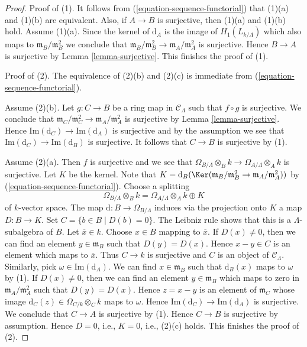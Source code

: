 \begin{proof}
Proof of (1). It follows from (\ref{equation-sequence-functorial})
that (1)(a) and (1)(b) are equivalent. Also, if
$A \to B$ is surjective, then (1)(a) and (1)(b) hold. Assume (1)(a).
Since the kernel of $\text{d}_A$ is the image of
$H_1(L_{k/\Lambda})$ which also maps to
$\mathfrak m_B/\mathfrak m_B^2$ we conclude that
$\mathfrak m_B/\mathfrak m_B^2 \to \mathfrak m_A/\mathfrak m_A^2$
is surjective. Hence $B \to A$ is surjective by
Lemma \ref{lemma-surjective}. This finishes the proof of (1).

\medskip\noindent
Proof of (2). The equivalence of (2)(b) and (2)(c) is immediate from
(\ref{equation-sequence-functorial}).

\medskip\noindent
Assume (2)(b). Let $g : C \to B$ be a ring map in $\mathcal{C}_\Lambda$
such that $f \circ g$ is surjective. We conclude that
$\mathfrak m_C/\mathfrak m_C^2 \to \mathfrak m_A/\mathfrak m_A^2$
is surjective by
Lemma \ref{lemma-surjective}.
Hence
$\text{Im}(\text{d}_C) \to \text{Im}(\text{d}_A)$ is surjective
and by the assumption we see that
$\text{Im}(\text{d}_C) \to \text{Im}(\text{d}_B)$ is surjective.
It follows that $C \to B$ is surjective by (1).

\medskip\noindent
Assume (2)(a). Then $f$ is surjective and we see that
$\Omega_{B/\Lambda} \otimes_B k \to \Omega_{A/\Lambda} \otimes_A k$
is surjective. Let $K$ be the kernel. Note that
$K = \text{d}_B(\Ker(\mathfrak m_B/\mathfrak m_B^2 \to
\mathfrak m_A/\mathfrak m_A^2))$ by (\ref{equation-sequence-functorial}).
Choose a splitting
$$
\Omega_{B/\Lambda} \otimes_B k =
\Omega_{A/\Lambda} \otimes_A k \oplus K
$$
of $k$-vector space. The map $\text{d} : B \to \Omega_{B/\Lambda}$
induces via the projection onto $K$ a map $D : B \to K$. Set
$C = \{b \in B \mid D(b) = 0\}$. The Leibniz rule shows that this is
a $\Lambda$-subalgebra of $B$. Let $\overline{x} \in k$. Choose $x \in B$
mapping to $\overline{x}$. If $D(x) \not = 0$, then we can find an element
$y \in \mathfrak m_B$ such that $D(y) = D(x)$. Hence $x - y \in C$ is
an element which maps to $\overline{x}$. Thus $C \to k$ is surjective
and $C$ is an object of $\mathcal{C}_\Lambda$. Similarly, pick
$\omega \in \text{Im}(\text{d}_A)$. We can find $x \in \mathfrak m_B$
such that $\text{d}_B(x)$ maps to $\omega$ by (1). If $D(x) \not = 0$, then
we can find an element $y \in \mathfrak m_B$ which maps to zero
in $\mathfrak m_A/\mathfrak m_A^2$ such that $D(y) = D(x)$.
Hence $z = x - y$ is an element of $\mathfrak m_C$ whose
image $\text{d}_C(z) \in \Omega_{C/k} \otimes_C k$ maps to $\omega$.
Hence $\text{Im}(\text{d}_C) \to \text{Im}(\text{d}_A)$ is surjective.
We conclude that $C \to A$ is surjective by (1). Hence $C \to B$ is
surjective by assumption. Hence $D = 0$, i.e., $K = 0$, i.e., (2)(c) holds.
This finishes the proof of (2).


\end{proof}
